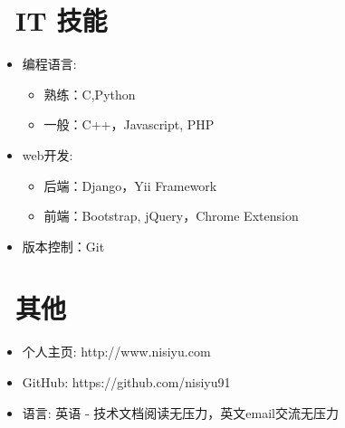 \documentclass{resume}
\begin{document}
\section{\faCogs\ IT 技能}
\begin{itemize}[parsep=0.5ex]
  \item 编程语言:
  \begin{itemize}
  \item 熟练：C,Python
  \item 一般：C++，Javascript, PHP
  \end{itemize}
  \item web开发:
  \begin{itemize}
  \item 后端：Django，Yii Framework
  \item 前端：Bootstrap, jQuery，Chrome Extension
  \end{itemize}
  \item 版本控制：Git
\end{itemize}


\section{\faInfo\ 其他}
\begin{itemize}[parsep=0.5ex]
  \item 个人主页: http://www.nisiyu.com
  \item GitHub: https://github.com/nisiyu91
  \item 语言: 英语 - 技术文档阅读无压力，英文email交流无压力
\end{itemize}

%
%
\end{document}
